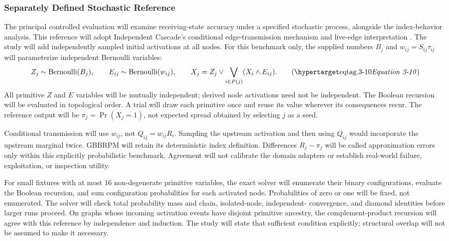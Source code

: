 \subsubsection{Separately Defined Stochastic Reference}
\label{stochastic-reference}

The principal controlled evaluation will examine receiving-state accuracy
under a specified stochastic process, alongside the index-behavior analysis.
This reference will adopt Independent Cascade's conditional edge-transmission
mechanism and live-edge interpretation \citep{kempe2003}. The study will add
independently sampled initial activations at all nodes. For this benchmark only,
the supplied numbers $B_j$ and $w_{ij}=S_{ij}\tau_{ij}$ will parameterize
independent Bernoulli variables:
\[
Z_j\sim\operatorname{Bernoulli}(B_j),\qquad
E_{ij}\sim\operatorname{Bernoulli}(w_{ij}),\qquad
X_j=Z_j\lor\bigvee_{i\in P(j)}(X_i\land E_{ij}).
\eqtag{3-10}
\]
All primitive $Z$ and $E$ variables will be mutually independent; derived
node activations need not be independent. The Boolean recursion will be
evaluated in topological order. A trial will draw each primitive once and
reuse its value wherever its consequences recur. The reference output will
be $\pi_j=\Pr(X_j=1)$, not expected spread obtained by selecting $j$ as a seed.

Conditional transmission will use $w_{ij}$, not $Q_{ij}=w_{ij}R_i$.
Sampling the upstream activation and then using $Q_{ij}$ would incorporate
the upstream marginal twice. GBBRPM will retain its deterministic index
definition. Differences $R_j-\pi_j$ will be called approximation errors only
within this explicitly probabilistic benchmark. Agreement will not calibrate
the domain adapters or establish real-world failure, exploitation, or
inspection utility.

For small fixtures with at most 16 non-degenerate primitive variables,
the exact solver will enumerate their binary configurations, evaluate the
Boolean recursion, and sum configuration probabilities for each activated
node. Probabilities of zero or one will be fixed, not enumerated. The solver
will check total probability mass and chain, isolated-node, independent-
convergence, and diamond identities before larger runs proceed. On graphs
whose incoming activation events have disjoint primitive ancestry, the
complement-product recursion will agree with this reference by independence
and induction. The study will state that sufficient condition explicitly;
structural overlap will not be assumed to make it necessary.

